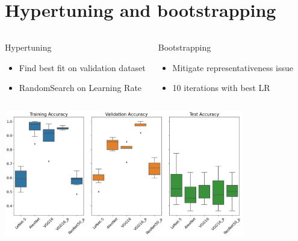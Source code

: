 \documentclass[aspectratio=169]{beamer}
\begin{document}
\section{Hypertuning and bootstrapping}
\begin{frame}{}
    \begin{columns}
        \begin{block}{Hypertuning}
            \begin{itemize}
                \item Find best fit on validation dataset
                \item RandomSearch on Learning Rate
            \end{itemize}
        \end{block}
        \begin{block}{Bootstrapping}
            \begin{itemize}
                \item Mitigate representativeness issue
                \item 10 iterations with best LR
            \end{itemize}
        \end{block}
    \end{columns}
    \centering
    \includegraphics[height=5.5cm]{./tex_graphs/bootstrap_results.png}
\end{frame}
\end{document}
